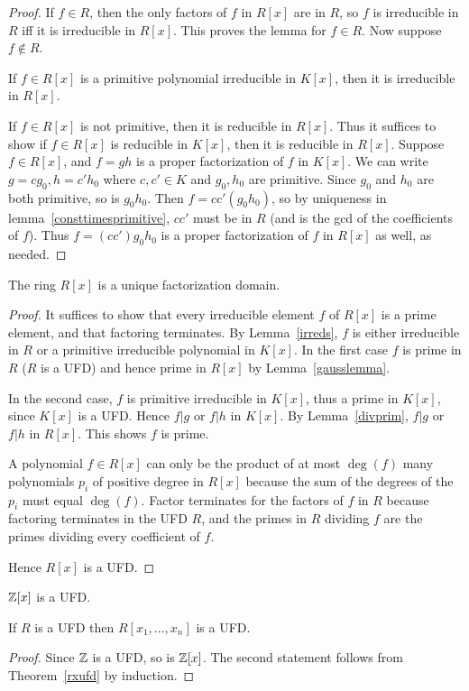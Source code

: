 \begin{proof}
If $f\in R$, then the only factors of $f$ in $R[x]$ are in $R$, so $f$ is irreducible in $R$ iff it is irreducible in $R[x]$. This proves the lemma for $f\in R$. Now suppose $f\not\in R$. 

If $f\in R[x]$ is a primitive polynomial irreducible in $K[x]$, then it is irreducible in $R[x]$.

If $f\in R[x]$ is not primitive, then it is reducible in $R[x]$. 
Thus it suffices to show if $f\in R[x]$ is reducible in $K[x]$, then it is reducible in $R[x]$.
Suppose $f\in R[x]$, and %
$f=gh$ is a proper factorization of $f$ in $K[x]$. We can write $g=cg_0,h=c'h_0$ where $c,c'\in K$ and $g_0,h_0$ are primitive. Since $g_0$ and $h_0$ are both primitive, so is $g_0h_0$. Then $f=cc'(g_0h_0)$, so by uniqueness in lemma~\ref{consttimesprimitive}, $cc'$ must be in $R$ (and is the gcd of the coefficients of $f$). Thus $f=(cc')g_0h_0$ is a proper factorization of $f$ in $R[x]$ as well, as needed. %
\end{proof}
\begin{thm}\label{rxufd}
The ring $R[x]$ is a unique factorization domain.
\end{thm}
\begin{proof}
It suffices to show that every irreducible element $f$ of $R[x]$ is a prime element, and that factoring terminates. By Lemma~\ref{irreds}, $f$ is either 
irreducible in $R$ or a primitive irreducible polynomial in $K[x]$. In the first case $f$ is prime in $R$ ($R$ is a UFD) and hence prime in $R[x]$ by Lemma~\ref{gausslemma}.

In the second case, $f$ is primitive irreducible in $K[x]$, thus a prime in $K[x]$, since $K[x]$ is a UFD. Hence $f|g$ or $f|h$ in $K[x]$. By Lemma~\ref{divprim}, $f|g$ or $f|h$ in $R[x]$. This shows $f$ is prime.

A polynomial $f\in R[x]$ can only be the product of at most $\deg(f)$ many polynomials $p_i$ of positive degree in $R[x]$ because the sum of the degrees of the $p_i$ must equal $\deg(f)$. Factor terminates for the factors of $f$ in $R$ because factoring terminates in the UFD $R$, and the primes in $R$ dividing $f$ are the primes dividing every coefficient of $f$.

Hence $R[x]$ is a UFD.
\end{proof}
\begin{cor}
$\mathbb{Z}[x]$ is a UFD. 

If $R$ is a UFD then $R[x_1,\ldots, x_n]$ is a UFD.
\end{cor}
\begin{proof}
Since $\mathbb{Z}$ is a UFD, so is $\mathbb{Z}[x]$. The second statement follows from Theorem~\ref{rxufd} by induction.
\end{proof}
